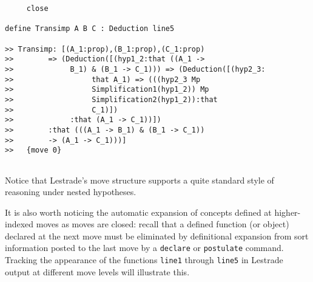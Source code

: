 \documentclass[12pt]{slides}
\begin{document}
\begin{slide}
{\begin{verbatim}
     close

define Transimp A B C : Deduction line5

>> Transimp: [(A_1:prop),(B_1:prop),(C_1:prop) 
>>        => (Deduction([(hyp1_2:that ((A_1 -> 
>>             B_1) & (B_1 -> C_1))) => (Deduction([(hyp2_3:
>>                  that A_1) => (((hyp2_3 Mp 
>>                  Simplification1(hyp1_2)) Mp 
>>                  Simplification2(hyp1_2)):that 
>>                  C_1)])
>>             :that (A_1 -> C_1))])
>>        :that (((A_1 -> B_1) & (B_1 -> C_1)) 
>>        -> (A_1 -> C_1)))]
>>   {move 0}


\end{verbatim}

}


\end{slide}

\begin{slide}

Notice that Lestrade's move structure supports a quite standard style of reasoning under nested hypotheses.

It is also worth noticing the automatic expansion of concepts defined at higher-indexed moves as moves are closed:  recall
that a defined function (or object) declared at the next move must be eliminated by definitional expansion from sort information posted to the last move
by a {\tt declare} or {\tt postulate} command.  Tracking the appearance of the functions {\tt line1} through {\tt line5} in Lestrade output at different move levels will illustrate this.

\end{slide}
\end{document}
